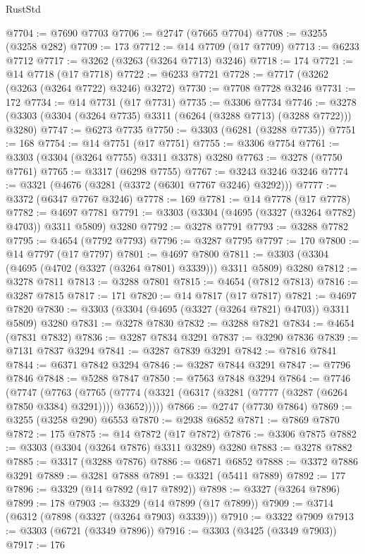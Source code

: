 \begin{lexlean}{RustStd}
\begin{coremodule}
{\begin{coremodule}
{{{{{{{{{{{{{{{{{{{{{{{{{{{{{{{{{@7704 := @7690 @7703
@7706 := @2747 (@7665 @7704)
@7708 := @3255 (@3258 @282)
@7709 := 173
@7712 := @14 @7709 (@17 @7709)
@7713 := @6233 @7712
@7717 := @3262 (@3263 (@3264 @7713) @3246)
@7718 := 174
@7721 := @14 @7718 (@17 @7718)
@7722 := @6233 @7721
@7728 := @7717 (@3262 (@3263 (@3264 @7722) @3246) @3272)
@7730 := @7708 @7728 @3246
@7731 := 172
@7734 := @14 @7731 (@17 @7731)
@7735 := @3306 @7734
@7746 := @3278 (@3303 (@3304 (@3264 @7735) @3311 (@6264 (@3288 @7713) (@3288 @7722))) @3280)
@7747 := @6273 @7735
@7750 := @3303 (@6281 (@3288 @7735))
@7751 := 168
@7754 := @14 @7751 (@17 @7751)
@7755 := @3306 @7754
@7761 := @3303 (@3304 (@3264 @7755) @3311 @3378) @3280
@7763 := @3278 (@7750 @7761)
@7765 := @3317 (@6298 @7755)
@7767 := @3243 @3246 @3246
@7774 := @3321 (@4676 (@3281 (@3372 (@6301 @7767 @3246) @3292)))
@7777 := @3372 (@6347 @7767 @3246)
@7778 := 169
@7781 := @14 @7778 (@17 @7778)
@7782 := @4697 @7781
@7791 := @3303 (@3304 (@4695 (@3327 (@3264 @7782) @4703)) @3311 @5809) @3280
@7792 := @3278 @7791
@7793 := @3288 @7782
@7795 := @4654 (@7792 @7793)
@7796 := @3287 @7795
@7797 := 170
@7800 := @14 @7797 (@17 @7797)
@7801 := @4697 @7800
@7811 := @3303 (@3304 (@4695 (@4702 (@3327 (@3264 @7801) @3339))) @3311 @5809) @3280
@7812 := @3278 @7811
@7813 := @3288 @7801
@7815 := @4654 (@7812 @7813)
@7816 := @3287 @7815
@7817 := 171
@7820 := @14 @7817 (@17 @7817)
@7821 := @4697 @7820
@7830 := @3303 (@3304 (@4695 (@3327 (@3264 @7821) @4703)) @3311 @5809) @3280
@7831 := @3278 @7830
@7832 := @3288 @7821
@7834 := @4654 (@7831 @7832)
@7836 := @3287 @7834 @3291
@7837 := @3290 @7836
@7839 := @7131 @7837 @3294
@7841 := @3287 @7839 @3291
@7842 := @7816 @7841
@7844 := @6371 @7842 @3294
@7846 := @3287 @7844 @3291
@7847 := @7796 @7846
@7848 := @5288 @7847
@7850 := @7563 @7848 @3294
@7864 := @7746
    (@7747
      (@7763
        (@7765 (@7774 (@3321 (@6317 (@3281 (@7777 (@3287 (@6264 @7850 @3384) @3291)))) @3652)))))
@7866 := @2747 (@7730 @7864)
@7869 := @3255 (@3258 @290) @6553
@7870 := @2938 @6852
@7871 := @7869 @7870
@7872 := 175
@7875 := @14 @7872 (@17 @7872)
@7876 := @3306 @7875
@7882 := @3303 (@3304 (@3264 @7876) @3311 @3289) @3280
@7883 := @3278 @7882
@7885 := @3317 (@3288 @7876)
@7886 := @6871 @6852
@7888 := @3372 @7886 @3291
@7889 := @3281 @7888
@7891 := @3321 (@5411 @7889)
@7892 := 177
@7896 := @3329 (@14 @7892 (@17 @7892))
@7898 := @3327 (@3264 @7896)
@7899 := 178
@7903 := @3329 (@14 @7899 (@17 @7899))
@7909 := @3714 (@6312 (@7898 (@3327 (@3264 @7903) @3339)))
@7910 := @3322 @7909
@7913 := @3303 (@6721 (@3349 @7896))
@7916 := @3303 (@3425 (@3349 @7903))
@7917 := 176
}}}}}}}}}}}}}}}}}}}}}}}}}}}}}}}}}
\end{coremodule}}
\end{coremodule}
\end{lexlean}
